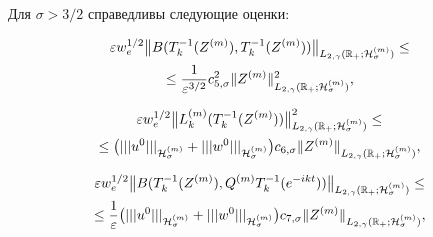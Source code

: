 \begin{lemma}[4]Для $\sigma>3/2$ справедливы следующие оценки\/$:$

\begin{multline}

\varepsilon w_e^{1/2}\bigl\| B(T^{-1}_{k}(Z^{(m)}),T^{-1}_{k}(Z^{(m)}))

\bigr\|_{L_{2,\gamma}(\mathbb R_{+};{\cal H}^{(m)}_{\sigma})}\le  

\\ 

\le \frac{1}{\varepsilon^{3/2}} c_{5,\sigma}^2 \|Z^{(m)} \|^2_{L_{2,\gamma}(\mathbb R_{+};{\cal H}^{(m)}_{\sigma})},

\label{duh:estBzz}

\end{multline}

\begin{multline}

\varepsilon w_e^{1/2}\bigl\| L^{(m)}_k(T_k^{-1}(Z^{(m)})) \bigr\| ^2_{L_{2,\gamma}(\mathbb R_{+};{\cal H}^{(m)}_{\sigma})}\le  

\\ 

\le 

\bigl(|||u^0|||_{{\cal H}^{(m)}_\sigma}+|||w^0|||_{{\cal H}^{(m)}_\sigma} \bigr)c_{6,\sigma}\|Z^{(m)} \|_{L_{2,\gamma}(\mathbb R_{+};{\cal H}^{(m)}_{\sigma})},


\label{duh:estBQz}

\end{multline}

\begin{multline}

\varepsilon w_e^{1/2} \bigl\| 

B(T^{-1}_{k}(Z^{(m)}),Q^{(m)}T^{-1}_{k}(e^{-ikt}))

\bigr\| _{L_{2,\gamma}(\mathbb R_{+};{\cal H}^{(m)}_{\sigma})} \le    

\\

\le \frac{1}{\varepsilon} \bigl(|||u^0|||_{{\cal H}^{(m)}_{\sigma}}+|||w^0|||_{{\cal H}^{(m)}_{\sigma}} \bigr) c_{7,\sigma} \|Z^{(m)} \|_{L_{2,\gamma}(\mathbb R_{+};{\cal H}^{(m)}_{\sigma})},


\label{duh:estBQz}

\end{multline}

 \begin{multline}


\end{multline}
\end{lemma}
